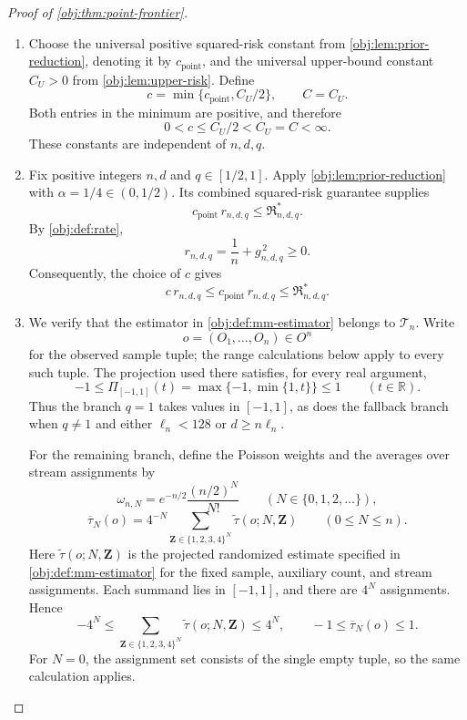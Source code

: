 \documentclass[11pt]{article}
\begin{document}
\begin{proof}[Proof of \cref{obj:thm:point-frontier}]
\begin{enumerate}
\item Choose the universal positive squared-risk constant from \cref{obj:lem:prior-reduction}, denoting it by \(c_{\mathrm{point}}\), and the universal upper-bound constant \(C_U>0\) from \cref{obj:lem:upper-risk}. Define
\[
c=\min\{c_{\mathrm{point}},C_U/2\},
\qquad C=C_U.
\]
Both entries in the minimum are positive, and therefore
\[
0<c\le C_U/2<C_U=C<\infty.
\]
These constants are independent of \(n,d,q\).

\item Fix positive integers \(n,d\) and \(q\in[1/2,1]\). Apply \cref{obj:lem:prior-reduction} with \(\alpha=1/4\in(0,1/2)\). Its combined squared-risk guarantee supplies
\[
c_{\mathrm{point}}\,r_{n,d,q}
\le \mathfrak R^*_{n,d,q}.
\]
By \cref{obj:def:rate},
\[
r_{n,d,q}=\frac1n+g_{n,d,q}^{\,2}\ge0.
\]
Consequently, the choice of \(c\) gives
\[
c\,r_{n,d,q}
\le c_{\mathrm{point}}\,r_{n,d,q}
\le \mathfrak R^*_{n,d,q}.
\]

\item We verify that the estimator in \cref{obj:def:mm-estimator} belongs to \(\mathcal T_n\). Write
\[
o=(O_1,\ldots,O_n)\in O^n
\]
for the observed sample tuple; the range calculations below apply to every such tuple. The projection used there satisfies, for every real argument,
\[
-1\le \Pi_{[-1,1]}(t)
=\max\{-1,\min\{1,t\}\}\le1
\qquad(t\in\mathbb R).
\]
Thus the branch \(q=1\) takes values in \([-1,1]\), as does the fallback branch when \(q\ne1\) and either \(\ell_n<128\) or \(d\ge n\ell_n\).

For the remaining branch, define the Poisson weights and the averages over stream assignments by
\[
\omega_{n,N}
=e^{-n/2}\frac{(n/2)^N}{N!}
\qquad(N\in\{0,1,2,\ldots\}),
\]
\[
\overline\tau_N(o)
=4^{-N}
\sum_{\mathbf Z\in\{1,2,3,4\}^{N}}
\widetilde\tau(o;N,\mathbf Z)
\qquad(0\le N\le n).
\]
Here \(\widetilde\tau(o;N,\mathbf Z)\) is the projected randomized estimate specified in \cref{obj:def:mm-estimator} for the fixed sample, auxiliary count, and stream assignments. Each summand lies in \([-1,1]\), and there are \(4^N\) assignments. Hence
\[
-4^N
\le
\sum_{\mathbf Z\in\{1,2,3,4\}^{N}}
\widetilde\tau(o;N,\mathbf Z)
\le4^N,
\qquad
-1\le\overline\tau_N(o)\le1.
\]
For \(N=0\), the assignment set consists of the single empty tuple, so the same calculation applies.


\end{enumerate}
\end{proof}
\end{document}
